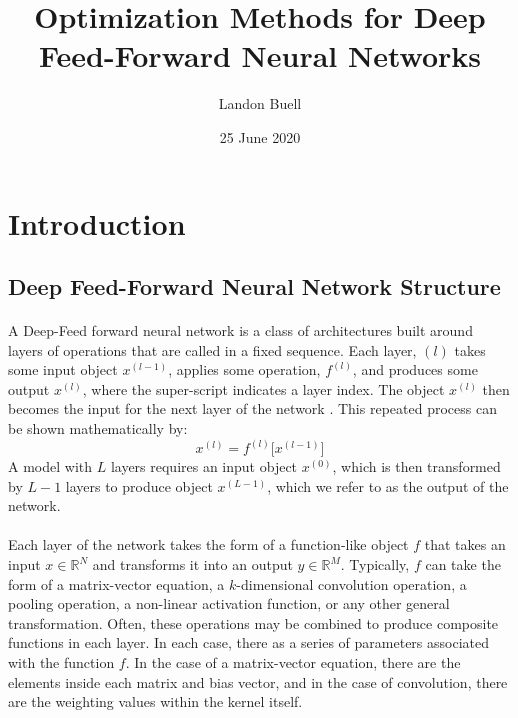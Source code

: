 \documentclass[12pt,letterpaper]{article}
\begin{document}

\title{Optimization Methods for Deep Feed-Forward Neural Networks}
\author{Landon Buell}
\date{25 June 2020}
\maketitle


\section{Introduction}


\subsection{Deep Feed-Forward Neural Network Structure}

\paragraph*{}A Deep-Feed forward neural network is a class of architectures built around layers of operations that are called in a fixed sequence. Each layer, $(l)$ takes some input object $x^{(l-1)}$, applies some operation, $f^{(l)}$, and produces some output $x^{(l)}$, where the super-script indicates a layer index. The object $x^{(l)}$ then becomes the input for the next layer of the network \cite{Geron,Goodfellow}. This repeated process can be shown mathematically by:
\begin{equation}
\label{feed-forward}
x^{(l)} = f^{(l)}\big[x^{(l-1)}\big]
\end{equation}
A model with $L$ layers requires an input object $x^{(0)}$, which is then transformed by $L-1$ layers to produce object $x^{(L-1)}$, which we refer to as the output of the network.

\paragraph*{}Each layer of the network takes the form of a function-like object $f$ that takes an input $x \in \mathbb{R}^N$ and transforms it into an output $y \in \mathbb{R}^M$. Typically, $f$ can take the form of a matrix-vector equation, a $k$-dimensional convolution operation, a pooling operation, a non-linear activation function, or any other general transformation. Often, these operations may be combined to produce composite functions in each layer. In each case, there as a series of parameters associated with the function $f$. In the case of a matrix-vector equation, there are the elements inside each matrix and bias vector, and in the case of convolution, there are the weighting values within the kernel itself. 
\end{document}
